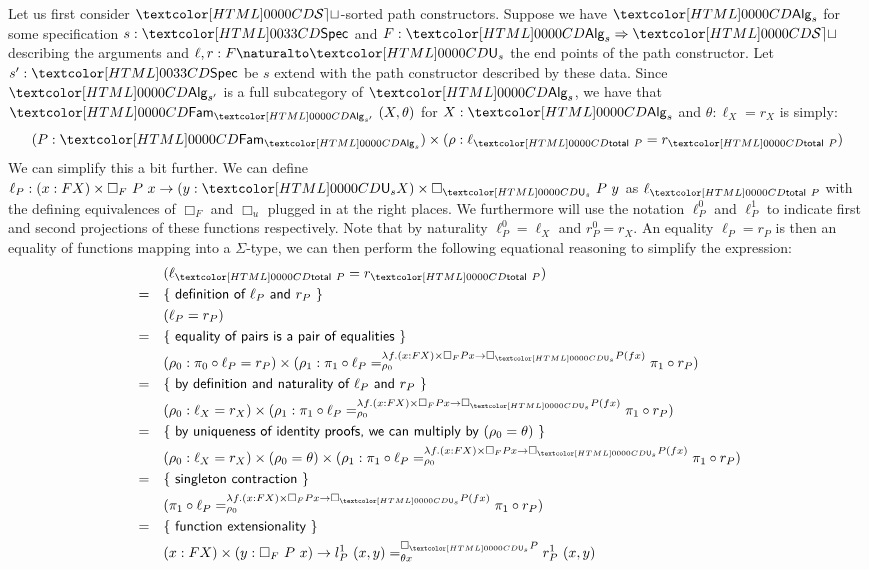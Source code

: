 Let us first consider $\SET$-sorted path constructors. Suppose we have
$\Alg_s$ for some specification $s : \specty$ and
$F : \Func{\Alg_s}{\SET}$ describing the arguments and
$\ell, r : \Nat{F}{\Und_s}$ the end points of the path constructor. Let
$s' : \specty$ be $s$ extend with the path constructor described by
these data. Since $\Alg_{s'}$ is a full subcategory of $\Alg_{s}$, we
have that $\Fam_{\Alg_{s'}}\ (X, \theta)$ for $X : \Alg_s$ and
$\theta : \ell_X = r_X$ is simply:
$$
(P : \Fam_{\Alg_s}) \times (\rho : \ell_{\total\ P} = r_{\total\ P})
$$
We can simplify this a bit further. We can define
$\ell_P : (x : FX) \times \Box_F\ P\ x \to (y : \Und_s X) \times \Box_{\Und_s}\ P\ y$
as $\ell_{\total\ P}$ with the defining equivalences of $\Box_F$ and
$\Box_u$ plugged in at the right places. We furthermore will use the
notation $\ell_P^0$ and $\ell_P^1$ to indicate first and second projections
of these functions respectively. Note that by naturality $\ell_P^0 = \ell_X$
and $r_P^0 = r_X$. An equality $\ell_P = r_P$ is then an equality of
functions mapping into a $\Sigma$-type, we can then perform the
following equational reasoning to simplify the expression:
%
\begin{align*}
  &&&(\ell_{\total\ P} = r_{\total\ P})  \\
  &=&&\reasontext{definition of $\ell_P$ and $r_P$} \\
  &&&(\ell_P = r_P) \\
  &=&&\reasontext{equality of pairs is a pair of equalities} \\
  &&&(\rho_0 : \pi_0 \circ \ell_P = r_P) \times (\rho_1 : \pathover{\lambda f . (x : FX) \times \Box_F P x \to \Box_{\Und_s} P (f x)}{\rho_0}{\pi_1 \circ \ell_P}{\pi_1 \circ r_P}) \\
  &=&&\reasontext{by definition and naturality of $\ell_P$ and $r_P$} \\
  &&&(\rho_0 : \ell_X = r_X) \times (\rho_1 : \pathover{\lambda f . (x : FX) \times \Box_F P x \to \Box_{\Und_s} P (f x)}{\rho_0}{\pi_1 \circ \ell_P}{\pi_1 \circ r_P}) \\
  &=&&\reasontext{by uniqueness of identity proofs, we can multiply by $(\rho_0 = \theta)$} \\
  &&&(\rho_0 : \ell_X = r_X) \times (\rho_0 = \theta) \times (\rho_1 : \pathover{\lambda f . (x : FX) \times \Box_F P x \to \Box_{\Und_s} P (f x)}{\rho_0}{\pi_1 \circ \ell_P}{\pi_1 \circ r_P}) \\
  &=&&\reasontext{singleton contraction} \\
  &&&(\pathover{\lambda f . (x : FX) \times \Box_F P x \to \Box_{\Und_s} P (f x)}{\rho_0}{\pi_1 \circ \ell_P}{\pi_1 \circ r_P}) \\
  &=&&\reasontext{function extensionality} \\
  &&&(x : FX) \times (y : \Box_F\ P\ x) \to \pathover{\Box_{\Und_s} P}{\theta x}{l^1_P\ (x , y)}{r^1_P\ (x , y)}
\end{align*}
%

